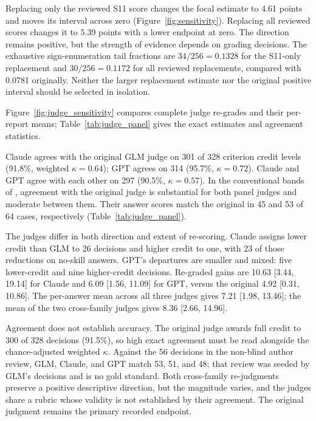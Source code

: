 \documentclass[11pt]{article}
\begin{document}
Replacing only the reviewed S11 score changes the focal estimate to 4.61 points and moves its interval across zero (Figure~\ref{fig:sensitivity}). Replacing all reviewed scores changes it to 5.39 points with a lower endpoint at zero. The direction remains positive, but the strength of evidence depends on grading decisions. The exhaustive sign-enumeration tail fractions are $34/256=0.1328$ for the S11-only replacement and $30/256=0.1172$ for all reviewed replacements, compared with 0.0781 originally. Neither the larger replacement estimate nor the original positive interval should be selected in isolation.

Figure~\ref{fig:judge_sensitivity} compares complete judge re-grades and their per-report means; Table~\ref{tab:judge_panel} gives the exact estimates and agreement statistics.




Claude agrees with the original GLM judge on 301 of 328 criterion credit levels (91.8\%, weighted $\kappa=0.64$); GPT agrees on 314 (95.7\%, $\kappa=0.72$). Claude and GPT agree with each other on 297 (90.5\%, $\kappa=0.57$). In the conventional bands of \citet{landis1977measurement}, agreement with the original judge is substantial for both panel judges and moderate between them. Their answer scores match the original in 45 and 53 of 64 cases, respectively (Table~\ref{tab:judge_panel}).

The judges differ in both direction and extent of re-scoring. Claude assigns lower credit than GLM to 26 decisions and higher credit to one, with 23 of those reductions on no-skill answers. GPT's departures are smaller and mixed: five lower-credit and nine higher-credit decisions. Re-graded gains are 10.63 [3.44, 19.14] for Claude and 6.09 [1.56, 11.09] for GPT, versus the original 4.92 [0.31, 10.86]. The per-answer mean across all three judges gives 7.21 [1.98, 13.46]; the mean of the two cross-family judges gives 8.36 [2.66, 14.96].

Agreement does not establish accuracy. The original judge awards full credit to 300 of 328 decisions (91.5\%), so high exact agreement must be read alongside the chance-adjusted weighted $\kappa$. Against the 56 decisions in the non-blind author review, GLM, Claude, and GPT match 53, 51, and 48; that review was seeded by GLM's decisions and is no gold standard. Both cross-family re-judgments preserve a positive descriptive direction, but the magnitude varies, and the judges share a rubric whose validity is not established by their agreement. The original judgment remains the primary recorded endpoint.
\end{document}
